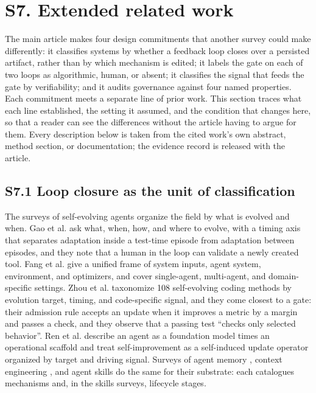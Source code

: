 \documentclass[
]{article}
\begin{document}
\section{S7. Extended related work}\label{s7.-extended-related-work}

The main article makes four design commitments that another survey could
make differently: it classifies systems by whether a feedback loop
closes over a persisted artifact, rather than by which mechanism is
edited; it labels the gate on each of two loops as algorithmic, human,
or absent; it classifies the signal that feeds the gate by
verifiability; and it audits governance against four named properties.
Each commitment meets a separate line of prior work. This section traces
what each line established, the setting it assumed, and the condition
that changes here, so that a reader can see the differences without the
article having to argue for them. Every description below is taken from
the cited work's own abstract, method section, or documentation; the
evidence record is released with the article.

\subsection{S7.1 Loop closure as the unit of
classification}\label{s7.1-loop-closure-as-the-unit-of-classification}

The surveys of self-evolving agents organize the field by what is
evolved and when. Gao et al. \cite{gao2026selfevolving} ask what, when,
how, and where to evolve, with a timing axis that separates adaptation
inside a test-time episode from adaptation between episodes, and they
note that a human in the loop can validate a newly created tool. Fang et
al. \cite{fang2025comprehensive} give a unified frame of system inputs,
agent system, environment, and optimizers, and cover single-agent,
multi-agent, and domain-specific settings. Zhou et al.
\cite{zhou2026selfevolvingcoding} taxonomize 108 self-evolving coding
methods by evolution target, timing, and code-specific signal, and they
come closest to a gate: their admission rule accepts an update when it
improves a metric by a margin and passes a check, and they observe that
a passing test ``checks only selected behavior''. Ren et al.
\cite{ren2026selfimprovementsurvey} describe an agent as a foundation
model times an operational scaffold and treat self-improvement as a
self-induced update operator organized by target and driving signal.
Surveys of agent memory
\cite{du2026memory, huang2026secondhalf, luo2026storage}, context
engineering \cite{mei2025context, hua2025context2}, and agent skills
\cite{zhou2026agentskills, ding2026skilleval, xia2026harnessing} do the
same for their substrate: each catalogues mechanisms and, in the skills
surveys, lifecycle stages.
\end{document}
